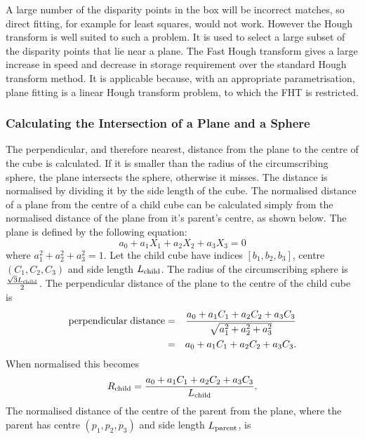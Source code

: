  A large number of the disparity points in the box will be
 incorrect matches, so direct fitting, for example for least squares, would
 not work. However the Hough transform is well suited to such a problem.
 It is used to select a large subset of the disparity points that lie
 near a plane. The Fast Hough transform
 gives a large increase in speed and decrease in storage
 requirement over the standard Hough transform method.
 It is applicable because, with an appropriate parametrisation,
 plane fitting is a linear Hough transform problem, to which the FHT
 is restricted.

 \subsubsection{Calculating the Intersection of a Plane and a Sphere}
  The perpendicular, and therefore nearest, distance from the plane to the
  centre of the cube is calculated. If it is smaller than the radius
  of the circumscribing sphere, the plane intersects the sphere,
  otherwise it misses. The distance is normalised by dividing it by
  the side length of the cube. The normalised distance of a plane
  from the centre of a child cube can be calculated simply from the
  normalised distance of the plane from it's parent's centre, as shown below.
  The plane is defined by the following equation:
  \begin{displaymath}
     a_0 + a_1 X_1 + a_2 X_2 + a_3 X_3 = 0
  \end{displaymath}
  where $a_1^2 + a_2^2 + a_3^2 = 1$. Let the child cube have indices
  $[b_1, b_2, b_3]$, centre $(C_1,C_2,C_3)$ and side length $L_{\rm child}$.
  The radius of the circumscribing sphere is
  $\frac{\sqrt{3} L_{\rm child}}{2}$. The perpendicular distance
  of the plane to the centre of the child cube is
  \begin{eqnarray}
     \rm{perpendicular\;distance} & = &
      \frac{a_0 + a_1 C_1 + a_2 C_2 + a_3 C_3}{\sqrt{a_1^2 + a_2^2 + a_3^2}}
      \nonumber \\
     & = & a_0 + a_1 C_1 + a_2 C_2 + a_3 C_3. \nonumber
  \end{eqnarray}
  When normalised this becomes
  \begin{equation}
     \label{child_norm_dist}
     R_{\rm child} = \frac{a_0 + a_1 C_1 + a_2 C_2 + a_3 C_3}{L_{\rm child}}.
  \end{equation}
  The normalised distance of the centre of the parent from the plane,
  where the parent has centre $(p_1,p_2,p_3)$ and side length
  $L_{\rm parent}$, is
